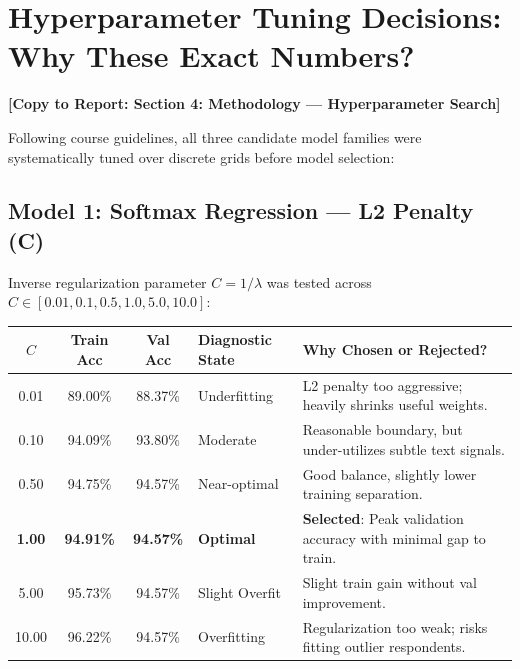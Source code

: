 \documentclass[11pt,a4paper]{article}
\newcommand{\reporttag}[1]{%
  \vspace{0.4em}\noindent\colorbox{tagblue!10}{\textbf{\textcolor{tagblue}{[Copy to Report: #1]}}}\vspace{0.2em}%
}
\begin{document}
\section{Hyperparameter Tuning Decisions: Why These Exact Numbers?}
\reporttag{Section 4: Methodology --- Hyperparameter Search}

Following course guidelines, all three candidate model families were systematically tuned over discrete grids before model selection:

\subsection{Model 1: Softmax Regression --- L2 Penalty (C)}
Inverse regularization parameter $C = 1/\lambda$ was tested across $C \in [0.01, 0.1, 0.5, 1.0, 5.0, 10.0]$:
\begin{center}
\small
\begin{tabularx}{\textwidth}{ccclX}
\toprule
$C$ & \textbf{Train Acc} & \textbf{Val Acc} & \textbf{Diagnostic State} & \textbf{Why Chosen or Rejected?} \\
\midrule
0.01 & 89.00\% & 88.37\% & Underfitting & L2 penalty too aggressive; heavily shrinks useful weights. \\
0.10 & 94.09\% & 93.80\% & Moderate & Reasonable boundary, but under-utilizes subtle text signals. \\
0.50 & 94.75\% & 94.57\% & Near-optimal & Good balance, slightly lower training separation. \\
\textbf{1.00} & \textbf{94.91\%} & \textbf{94.57\%} & \textbf{Optimal} & \textbf{Selected}: Peak validation accuracy with minimal gap to train. \\
5.00 & 95.73\% & 94.57\% & Slight Overfit & Slight train gain without val improvement. \\
10.00 & 96.22\% & 94.57\% & Overfitting & Regularization too weak; risks fitting outlier respondents. \\
\bottomrule
\end{tabularx}
\end{center}
\end{document}

